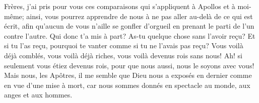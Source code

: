 Frères, j’ai pris pour vous ces comparaisons qui s’appliquent à Apollos et à moi-même;
	ainsi, vous pourrez apprendre de nous à ne pas aller au-delà de ce qui est écrit,
	afin qu’aucun de vous n’aille se gonfler d’orgueil
		en prenant le parti de l’un contre l’autre.
Qui donc t’a mis à part? As-tu quelque chose sans l’avoir reçu?
Et si tu l’as reçu, pourquoi te vanter comme si tu ne l’avais pas reçu?
Vous voilà déjà comblés, vous voilà déjà riches, vous voilà devenus rois sans nous!
	Ah! si seulement vous étiez devenus rois,
	pour que nous aussi, nous le soyons avec vous!
Mais nous, les Apôtres,
	il me semble que Dieu nous a exposés en dernier comme en vue d’une mise à mort,
	car nous sommes donnés en spectacle au monde, aux anges et aux hommes.
